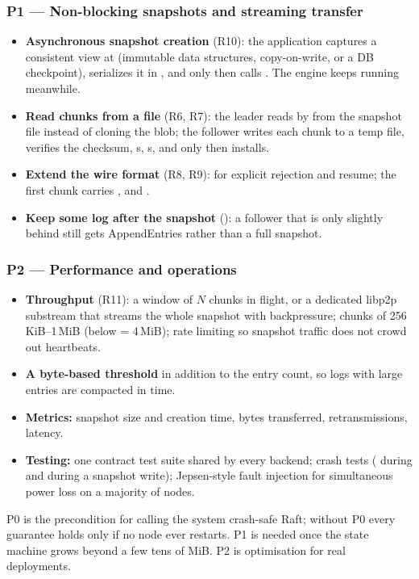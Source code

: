 \subsubsection{P1 --- Non-blocking snapshots and streaming transfer}

\begin{itemize}[nosep]
  \item \textbf{Asynchronous snapshot creation} (R10): the application captures a consistent view at
     (immutable data structures, copy-on-write, or a DB checkpoint), serializes it in
    , and only then calls . The engine keeps running meanwhile.
  \item \textbf{Read chunks from a file} (R6, R7): the leader reads by  from the snapshot file
    instead of cloning the blob; the follower writes each chunk to a temp file, verifies the checksum,
    s, s, and only then installs.
  \item \textbf{Extend the wire format} (R8, R9):
     for explicit rejection and resume;
    the first chunk carries ,  and .
  \item \textbf{Keep some log after the snapshot} (): a follower that is only slightly
    behind still gets AppendEntries rather than a full snapshot.
\end{itemize}

\subsubsection{P2 --- Performance and operations}

\begin{itemize}[nosep]
  \item \textbf{Throughput} (R11): a window of $N$ chunks in flight, or a dedicated libp2p substream that
    streams the whole snapshot with backpressure; chunks of 256\,KiB--1\,MiB (below
     = 4\,MiB); rate limiting so snapshot traffic does not crowd out heartbeats.
  \item \textbf{A byte-based threshold} in addition to the entry count, so logs with large entries are
    compacted in time.
  \item \textbf{Metrics:} snapshot size and creation time, bytes transferred, retransmissions,
     latency.
  \item \textbf{Testing:} one  contract test suite shared by every backend; crash tests
    ( during  and during a snapshot write); Jepsen-style fault injection for
    simultaneous power loss on a majority of nodes.
\end{itemize}

\begin{invariantbox}
P0 is the precondition for calling the system crash-safe Raft; without P0 every guarantee holds only if
no node ever restarts. P1 is needed once the state machine grows beyond a few tens of MiB. P2 is
optimisation for real deployments.
\end{invariantbox}
